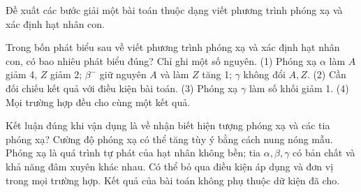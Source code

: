 \begin{bt}
Đề xuất các bước giải một bài toán thuộc dạng viết phương trình phóng xạ và xác định hạt nhân con.
\end{bt}

\begin{ex}
Trong bốn phát biểu sau về viết phương trình phóng xạ và xác định hạt nhân con, có bao nhiêu phát biểu đúng? Chỉ ghi một số nguyên. (1) Phóng xạ $\alpha$ làm $A$ giảm 4, $Z$ giảm 2; $\beta^-$ giữ nguyên $A$ và làm $Z$ tăng 1; $\gamma$ không đổi $A,Z$. (2) Cần đối chiếu kết quả với điều kiện bài toán. (3) Phóng xạ $\gamma$ làm số khối giảm 1. (4) Mọi trường hợp đều cho cùng một kết quả.
\end{ex}

\begin{ex}
Kết luận đúng khi vận dụng là về nhận biết hiện tượng phóng xạ và các tia phóng xạ?
\choice
{Cường độ phóng xạ có thể tăng tùy ý bằng cách nung nóng mẫu.}
{\True Phóng xạ là quá trình tự phát của hạt nhân không bền; tia $\alpha,\beta,\gamma$ có bản chất và khả năng đâm xuyên khác nhau.}
{Có thể bỏ qua điều kiện áp dụng và đơn vị trong mọi trường hợp.}
{Kết quả của bài toán không phụ thuộc dữ kiện đã cho.}
\end{ex}


